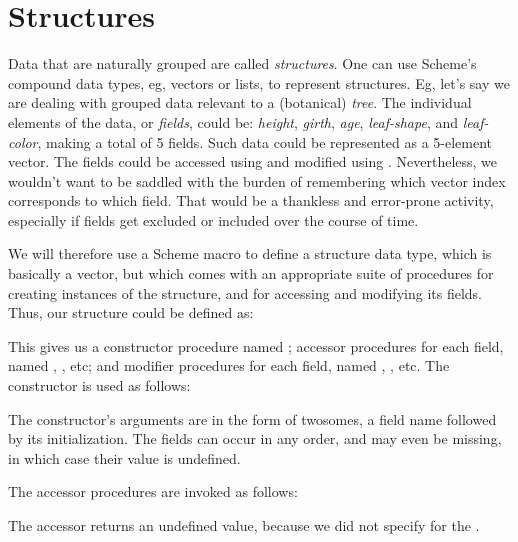 \chapter{Structures}

Data that are naturally grouped are called {\em
structures}.  One can use Scheme's compound data types,
eg, vectors or lists, to represent structures.  Eg,
let's say we are dealing with grouped data relevant to
a (botanical) {\em tree}.  The individual elements of
the data, or {\em fields}, could be: {\em height}, {\em
girth}, {\em age}, {\em leaf-shape}, and {\em
leaf-color}, making a total of 5 fields.  Such data
could be represented as a 5-element vector.  The fields
could be accessed using
 and modified using .
Nevertheless, we wouldn't want to be saddled with the
burden of remembering which vector index corresponds to
which field.  That would be a thankless and error-prone
activity, especially if fields get excluded or included
over the course of time.


We will therefore use a Scheme macro  to
define a structure data type, which is basically a
vector, but which comes with an appropriate suite of
procedures for creating instances of the structure, and
for accessing and modifying its fields.  Thus, our 
structure could be defined as:


This gives us a constructor procedure named
; accessor procedures for each field,
named
, , etc; and modifier
procedures for each field, named ,
, etc.  The constructor is used as
follows:


\n The constructor's arguments are in the form of
twosomes, a field name followed by its initialization.
The fields can occur in any order, and may even be
missing, in which case their value is undefined.

The accessor procedures are invoked as follows:


\n The  accessor returns an undefined value,
because we did not specify  for the
 .

